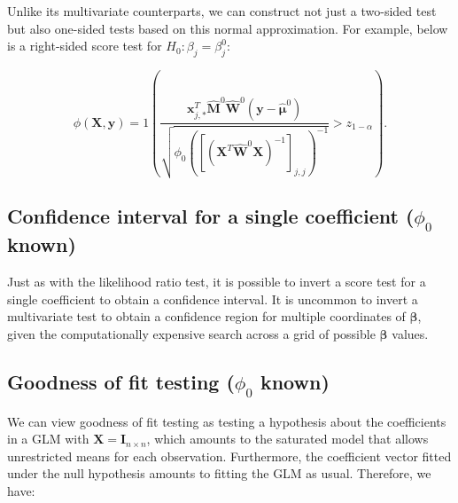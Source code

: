 \documentclass[
  11pt,
  letterpaper,
  oneside]{book}
\theoremstyle{definition}
\theoremstyle{plain}
\theoremstyle{plain}
\theoremstyle{plain}
\theoremstyle{remark}
\begin{document}
Unlike its multivariate counterparts, we can construct not just a
two-sided test but also one-sided tests based on this normal
approximation. For example, below is a right-sided score test for
\(H_0: \beta_j = \beta_j^0\):

\[
\phi(\boldsymbol{X}, \boldsymbol{y}) = 1\left(\frac{\boldsymbol{x}_{j,*}^T \boldsymbol{\widehat{M}}^0 \boldsymbol{\widehat{W}}^0 (\boldsymbol{y} - \boldsymbol{\widehat{\mu}}^0)}{\sqrt{\phi_0 ([(\boldsymbol{X}^T \boldsymbol{\widehat{W}}^0 \boldsymbol{X})^{-1}]_{j, j})^{-1}}} > z_{1-\alpha}\right).
\]

\hypertarget{sec-score-ci-single-coeff}{%
\subsection{\texorpdfstring{Confidence interval for a single coefficient
(\(\phi_0\)
known)}{Confidence interval for a single coefficient (\textbackslash phi\_0 known)}}\label{sec-score-ci-single-coeff}}

Just as with the likelihood ratio test, it is possible to invert a score
test for a single coefficient to obtain a confidence interval. It is
uncommon to invert a multivariate test to obtain a confidence region for
multiple coordinates of \(\boldsymbol{\beta}\), given the
computationally expensive search across a grid of possible
\(\boldsymbol{\beta}\) values.

\hypertarget{sec-score-goodness-of-fit}{%
\subsection{\texorpdfstring{Goodness of fit testing (\(\phi_0\)
known)}{Goodness of fit testing (\textbackslash phi\_0 known)}}\label{sec-score-goodness-of-fit}}

We can view goodness of fit testing as testing a hypothesis about the
coefficients in a GLM with
\(\boldsymbol{X} = \boldsymbol{I}_{n \times n}\), which amounts to the
saturated model that allows unrestricted means for each observation.
Furthermore, the coefficient vector fitted under the null hypothesis
amounts to fitting the GLM as usual. Therefore, we have:
\end{document}
